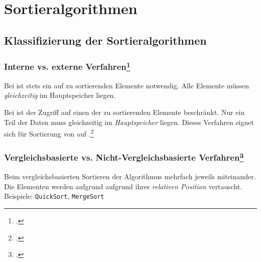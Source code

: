 \documentclass{lehramt-informatik-haupt}
\begin{document}

\chapter{Sortieralgorithmen}

\begin{liQuellen}
\cite{wiki:sortierverfahren}
\end{liQuellen}

\section{Klassifizierung der Sortieralgorithmen}

%

\subsection{Interne vs. externe Verfahren\footcite[Seite 34]{aud:fs:tafeluebung-11}}

Bei  ist stets ein  auf  zu sortierenden Elemente notwendig. Alle
Elemente müssen \emph{gleichzeitig} im Hauptspeicher liegen.

Bei  ist der Zugriff auf einen
 der zu sortierenden Elemente beschränkt. Nur ein Teil der
Daten muss gleichzeitig im \emph{Hauptspeicher} liegen. Dieses Verfahren
eignet sich für Sortierung von  auf .\footcite[Seite 124]{saake}

%

\subsection{Vergleichsbasierte vs. Nicht-Vergleichsbasierte Verfahren\footcite[Seite
35]{aud:fs:tafeluebung-11}}

Beim vergleichsbasierten Sortieren  der Algorithmus
mehrfach jeweils  miteinander. Die Elementen werden
aufgrund aufgrund ihrer \emph{relativen Position} vertauscht. Beispiele:
\verb|QuickSort|, \verb|MergeSort|
\end{document}
